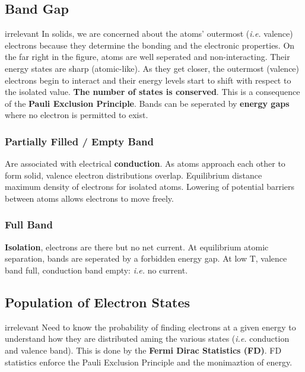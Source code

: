 \documentclass[a4paper, fontsize=8pt, landscape, DIV=1]{scrartcl}
\newcommand{\makeultracompact}{irrelevant}
\begin{document}
\begin{multicols*}{4}
  \subsection{Band Gap}
  \ifdefined\makeultracompact\else
    In solids, we are concerned about the atoms' outermost (\textit{i.e.} valence) electrons because they determine the bonding and the electronic properties.
    On the far right in the figure, atoms are well seperated and non-interacting. 
    Their energy states are sharp (atomic-like). 
    As they get closer, the outermost (valence) electrons begin to interact and their energy levels start to shift with respect to the isolated value. 
    \textbf{The number of states is conserved}. 
    This is a consequence of the \textbf{Pauli Exclusion Principle}. 
    Bands can be seperated by \textbf{energy gaps} where no electron is permitted to exist.
  
    \subsubsection{Partially Filled / Empty Band}
    Are associated with electrical \textbf{conduction}. 
    As atoms approach each other to form solid, valence electron distributions overlap. 
    Equilibrium distance ~ maximum density of electrons for isolated atoms.  
    Lowering of potential barriers between atoms allows electrons to move freely.

    \subsubsection{Full Band}
    \textbf{Isolation}, electrons are there but no net current. 
    At equilibrium atomic separation, bands are seperated by a forbidden energy gap. 
    At low T, valence band full, conduction band empty: \textit{i.e.} no current.
  \fi

  \subsection{Population of Electron States}
  \ifdefined\makeultracompact\else
    Need to know the probability of finding electrons at a given energy to understand how they are distributed aming the various states 
    (\textit{i.e.} conduction and valence band). 
    This is done by the \textbf{Fermi Dirac Statistics (FD)}. 
    FD statistics enforce the Pauli Exclusion Principle and the monimaztion of energy.
  \fi
  

\end{multicols*}
\end{document}
